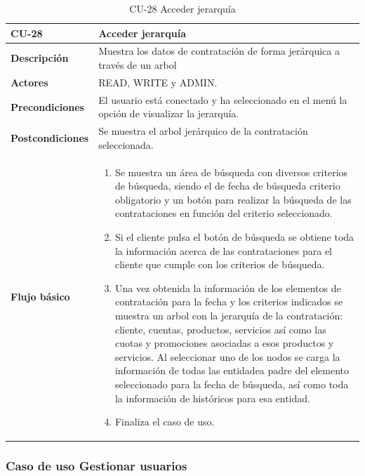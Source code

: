 \begin{table} [H]
    \centering
    \setlength{\leftmargini}{0.4cm}
	\resizebox{14cm}{!} { %
    \begin{tabular}{| m{3cm} | m{11cm} |}   
    \hline
	  \textbf{CU-28} & \textbf{Acceder jerarquía} \\\hline
	  \textbf{Descripción} & Muestra los datos de contratación de forma jerárquica a través de un arbol \\\hline
	  \textbf{Actores} & READ, WRITE y ADMIN. \\\hline
	  \textbf{Precondiciones} & El usuario está conectado y ha seleccionado en el menú la opción de visualizar la jerarquía. \\\hline
	  \textbf{Postcondiciones} & Se muestra el arbol jerárquico de la contratación seleccionada. \\\hline
	  \textbf{Flujo básico} & 
		\begin{enumerate}
	  	\item Se muestra un área de búsqueda con diversos criterios de búsqueda, siendo el de fecha de búsqueda criterio obligatorio y un botón para realizar la búsqueda de las contrataciones en función del criterio seleccionado. 
	  	\item Si el cliente pulsa el botón de búsqueda se obtiene toda la información acerca de las contrataciones para el cliente que cumple con los criterios de búsqueda. 
	  	\item Una vez obtenida la información de los elementos de contratación para la fecha y los criterios indicados se muestra un arbol con la jerarquía de la contratación: cliente, cuentas, productos, servicios así como las cuotas y promociones asociadas a esos productos y servicios. Al seleccionar uno de los nodos se carga la información de todas las entidadea padre del elemento seleccionado para la fecha de búsqueda, así como toda la información de históricos para esa entidad.
	  	\item Finaliza el caso de uso.
	  \end{enumerate} 	  	  
	  \\\hline
    \end{tabular}
    } %
    \caption{CU-28 Acceder jerarquía}
    \label{tab:cu-acceder-jerarquia}
\end{table}



\subsubsection{Caso de uso Gestionar usuarios} 
\label{sub:cu-gestionar-usuarios}


